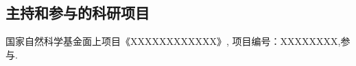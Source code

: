 \ifblindreview
\else
\subsection*{主持和参与的科研项目}
\begin{enumerate}[label={[\arabic*]}]
\item 国家自然科学基金面上项目《XXXXXXXXXXXX》, 项目编号：XXXXXXXX,参与.
\end{enumerate}

\fi

\newpage

\ifblindreview
\else

\newpage
\fi